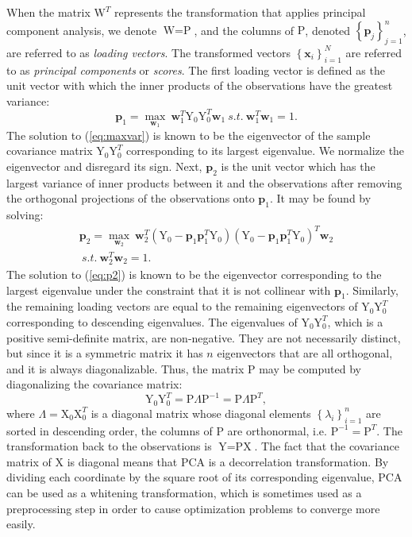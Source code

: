 \documentclass[journal]{IEEEtran}
\begin{document}
When the matrix $\text{W}^T$ represents the transformation that applies principal component analysis, we denote $\text{W}=\text{P}$, and the columns of $\text{P}$, denoted $\left\{ \textbf{p}_j \right\}_{j=1}^n$, are referred to as \emph{loading vectors}. The transformed vectors $\left\{ \textbf{x}_i \right\}_{i=1}^N$ are referred to as \emph{principal components} or \emph{scores}. The first loading vector is defined as the unit vector with which the inner products of the observations have the greatest variance: 
\begin{equation}
\textbf{p}_1 = \underset{\textbf{w}_1}{\max}{~\textbf{w}_1^T \text{Y}_0 \text{Y}_0^T \textbf{w}_1 }~s.t.~\textbf{w}_1^T \textbf{w}_1 = 1.
\label{eq:maxvar}
\end{equation}
The solution to (\ref{eq:maxvar}) is known to be the eigenvector of the sample covariance matrix $\text{Y}_0 \text{Y}_0^T$ corresponding to its largest eigenvalue. We normalize the eigenvector and disregard its sign. Next, $\textbf{p}_2$ is the unit vector which has the largest variance of inner products between it and the observations after removing the orthogonal projections of the observations onto $\textbf{p}_1$. It may be found by solving:
\begin{multline}
\textbf{p}_2 = \underset{\textbf{w}_2}{\max}{~\textbf{w}_2^T \left( \text{Y}_0 - \textbf{p}_1 \textbf{p}_1^T \text{Y}_0 \right) \left( \text{Y}_0 - \textbf{p}_1 \textbf{p}_1^T \text{Y}_0 \right)^T \textbf{w}_2 }\\~s.t.~ \textbf{w}_2^T \textbf{w}_2 = 1.
\label{eq:p2}
\end{multline}
The solution to (\ref{eq:p2}) is known to be the eigenvector corresponding to the largest eigenvalue under the constraint that it is not collinear with $\textbf{p}_1$. Similarly, the remaining loading vectors are equal to the remaining eigenvectors of $\text{Y}_0 \text{Y}_0^T$ corresponding to descending eigenvalues. The eigenvalues of $\text{Y}_0 \text{Y}_0^T$, which is a positive semi-definite matrix, are non-negative. They are not necessarily distinct, but since it is a symmetric matrix it has $n$ eigenvectors that are all orthogonal, and it is always diagonalizable. Thus, the matrix $\text{P}$ may be computed by diagonalizing the covariance matrix:
\[
\text{Y}_0 \text{Y}_0^T = \text{P} \Lambda \text{P}^{-1} = \text{P} \Lambda \text{P}^T,
\]
where $\Lambda = \text{X}_0 \text{X}_0^T$ is a diagonal matrix whose diagonal elements $\left\{ \lambda_i \right\}_{i=1}^n$ are sorted in descending order, the columns of $\text{P}$ are orthonormal, i.e. $\text{P}^{-1}=\text{P}^T$. The transformation back to the observations is $\text{Y} = \text{P} \text{X}$. The fact that the covariance matrix of $\text{X}$ is diagonal means that PCA is a decorrelation transformation. By dividing each coordinate by the square root of its corresponding eigenvalue, PCA can be used as a whitening transformation, which is sometimes used as a preprocessing step in order to cause optimization problems to converge more easily.
\end{document}
